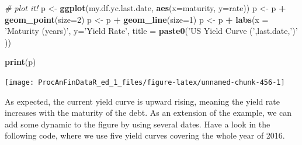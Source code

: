 \documentclass[11pt,]{book}
\newenvironment{Shaded}{\begin{snugshade}}{\end{snugshade}}
\newcommand{\KeywordTok}[1]{\textcolor[rgb]{0.27,0.27,0.27}{\textbf{#1}}}
\newcommand{\DataTypeTok}[1]{\textcolor[rgb]{0.27,0.27,0.27}{#1}}
\newcommand{\DecValTok}[1]{\textcolor[rgb]{0.06,0.06,0.06}{#1}}
\newcommand{\StringTok}[1]{\textcolor[rgb]{0.5,0.5,0.5}{#1}}
\newcommand{\CommentTok}[1]{\textcolor[rgb]{0.56,0.35,0.01}{\textit{#1}}}
\newcommand{\OperatorTok}[1]{\textcolor[rgb]{0.81,0.36,0.00}{\textbf{#1}}}
\newcommand{\NormalTok}[1]{#1}
\begin{document}
\begin{Shaded}
\begin{Highlighting}[]
\CommentTok{# plot it!}
\NormalTok{p <-}\StringTok{ }\KeywordTok{ggplot}\NormalTok{(my.df.yc.last.date, }\KeywordTok{aes}\NormalTok{(}\DataTypeTok{x=}\NormalTok{maturity, }\DataTypeTok{y=}\NormalTok{rate))}
\NormalTok{p <-}\StringTok{ }\NormalTok{p }\OperatorTok{+}\StringTok{ }\KeywordTok{geom_point}\NormalTok{(}\DataTypeTok{size=}\DecValTok{2}\NormalTok{)}
\NormalTok{p <-}\StringTok{ }\NormalTok{p }\OperatorTok{+}\StringTok{ }\KeywordTok{geom_line}\NormalTok{(}\DataTypeTok{size=}\DecValTok{1}\NormalTok{)}
\NormalTok{p <-}\StringTok{ }\NormalTok{p }\OperatorTok{+}\StringTok{ }\KeywordTok{labs}\NormalTok{(}\DataTypeTok{x =} \StringTok{'Maturity (years)'}\NormalTok{, }
              \DataTypeTok{y=}\StringTok{'Yield Rate'}\NormalTok{,}
              \DataTypeTok{title =} \KeywordTok{paste0}\NormalTok{(}\StringTok{'US Yield Curve ('}\NormalTok{,last.date,}\StringTok{')'}\NormalTok{ ))}

\KeywordTok{print}\NormalTok{(p)}
\end{Highlighting}
\end{Shaded}

\begin{center}\texttt{[image: ProcAnFinDataR\_ed\_1\_files/figure-latex/unnamed-chunk-456-1]} \end{center}

As expected, the current yield curve is upward rising, meaning the yield
rate increases with the maturity of the debt. As an extension of the
example, we can add some dynamic to the figure by using several dates.
Have a look in the following code, where we use five yield curves
covering the whole year of 2016.
\end{document}
